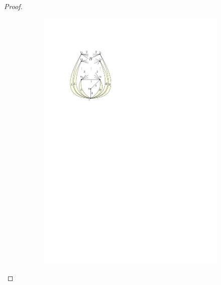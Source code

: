 \documentclass[runningheads]{llncs}
\numberwithin{equation}{section}
\begin{document}
\begin{proof}
\begin{figure}[htpb]
\begin{subfigure}[b]{0.4\textwidth}
         \includegraphics[scale=1]{img/act-hamilton-cycle-a}
     \end{subfigure}
     \hfill
     \begin{subfigure}[b]{0.3\textwidth}
         \centering

\end{subfigure}
\end{figure}
\end{proof}
\end{document}
